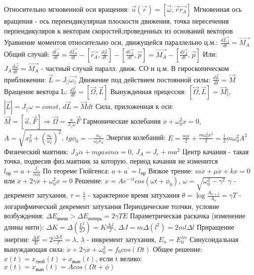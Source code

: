 \documentclass[10pt,a4paper]{article}
\begin{document}
\begin{flushleft}
Относительно мгновенной оси вращения: $\vec{u}(\vec{r})=[\vec{\omega}, \vec{r}\vec{r_{A}}]$ \break
Мгновенная ось вращения - ось перпендикулярная плоскости движения, точка пересечения перпендикуляров к векторам скоростей,проведенных из оснований векторов \break
Уравнение моментов относительно оси, движущейся параллельно ц.м.: $\frac{d\vec{L_{A}}}{dt}=\vec{M_{A}}$ \break
Общий случай: $\frac{d\vec{l_{A}}}{dt}=\frac{d\vec{L_{0}}}{dt}-[\vec{r_{A}}, \frac{d\vec{p}}{dt}]-[\frac{d\vec{r_{A}}}{dt},\vec{p}]=\vec{M_{A}}-[\frac{d\vec{r_{A}}}{dt}, \vec{p}]$ \break
Или: $J_{A}\frac{d\vec{\omega}}{dt}=\vec{M_{A}}$ - частный случай паралл. движ. СО и ц.м. \break
В гироскопическом приближении: $\vec{L}=J_{||}\vec{\omega_{||}}$  \break
Движение под действием постоянной силы: $\frac{d\vec{L}}{dt}=\vec{M}$ \break
Вращение вектора L: $\frac{d\vec{L}}{dt}=[\vec{\Omega}, \vec{L}]$ \break
Вынужденная прецессия: $[\vec{\Omega}, \vec{L}]=\vec{M}]$, $|\vec{L}|=J_{||}\omega=const$, $d\vec{L}=\vec{M}dt$ \break
Сила, приложенная к оси: $\vec{M}=[\vec{a}, \vec{F}]\Rightarrow \vec{\Omega}=\frac{a}{J_{||}\omega}\vec{F}$ \break
Гармонические колебания \break
$\ddot{x}+\omega^{2}_{0}x=0$, $A=\sqrt{x^{2}_{0}+(\frac{u_{0}}{\omega_{0}})^2}$, $tg\phi_{0}=-\frac{u_{0}}{\omega_{0}x_{0}}$ \break
Энергия колебаний: $E=\frac{m\dot{x}}{2}+\frac{m\omega^{2}_{0}x^2}{2}=\frac{1}{2}m\omega^{2}_{0}A^2$ \break
Физический маятник: $J_{A}\ddot{\alpha}+mgasin\alpha=0$, $J_{A}=J_{c}+ma^2$ \break
Центр качания - такая точка, подвесив физ.маятник за которую, период качания не изменится \break
$l_{\text{пр}}=a+\frac{J_{c}}{ma}$ \break
По теореме Гюйгенса: $a+a^{'}=l_{\text{пр}}$ \break
Вязкое трение: $m\ddot{x}+\mu{\dot{x}}+kx=0$ или $\ddot{x}+2\gamma{\dot{x}}+\omega^{2}_{0}x=0$\break
Решение: $x=Ae^{-\gamma{t}}cos(\omega{t}+\phi_{0})$, $\omega=\sqrt{\omega^{2}_{0}-\gamma^2}$ \break
$\gamma$ - декремент затухания, $\tau=\frac{1}{\gamma}$ - характерное время затухания \break
$\theta=\log{\frac{A_{n+1}}{A_{n}}}=\gamma{T}$ - логарифмический декремент затухания \break
Периодические толчки, условие возбуждения: $\Delta{E_{\text{внеш}}}>\Delta{E_{\text{потерь}}}=2\gamma{TE}$ \break
Параметрическая раскачка (изменение длины нити): \break
$\Delta{K}=\Delta(\frac{L^2}{2J})=K\frac{\Delta{J}}{J}$, $\Delta{J}=m\Delta(l^2)=2ml\Delta{l}$ \break
Приращение энергии: $\frac{\Delta{E}}{E}=2\frac{|\Delta{J}|}{J}=\lambda$, $\lambda$ - инкремент затухания, $E_{n}=E^{\lambda{n}}_{0}$ \break
Синусоидальная вынуждающая сила: $\ddot{x}+2\gamma\dot{x}+\omega^{2}_{0}=f_{0}cos(\Omega{t})$ \break
Общее решение: $x(t)=x_{\text{своб}}(t)+x_{\text{вын}}(t)$, если t велико: $x(t)=x_{\text{вын}}(t)=Acos(\Omega{t}+\phi)$\break

\end{flushleft}
\end{document}
